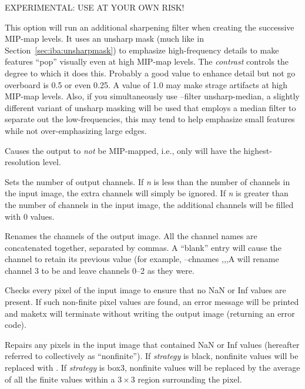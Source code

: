 EXPERIMENTAL: USE AT YOUR OWN RISK!

This option will run an additional sharpening filter
when creating the successive MIP-map levels. It uses an unsharp mask
(much like in Section~\ref{sec:iba:unsharpmask}) to emphasize high-frequency
details to make features ``pop'' visually even at high MIP-map levels.
The \emph{contrast} controls the degree to which it does this. Probably
a good value to enhance detail but not go overboard is 0.5 or even 0.25.
A value of 1.0 may make strage artifacts at high MIP-map levels. Also, if
you simultaneously use {\cf --filter unsharp-median}, a slightly different
variant of unsharp masking will be used that employs a median filter to
separate out the low-frequencies, this may tend to help emphasize small
features while not over-emphasizing large edges. 
\apiend

Causes the output to \emph{not} be MIP-mapped, i.e., only will have
the highest-resolution level.
\apiend

Sets the number of output channels.  If \emph{n} is less than the 
number of channels in the input image, the extra channels will simply
be ignored.  If \emph{n} is greater than the number of channels in the
input image, the additional channels will be filled with 0 values.
\apiend

Renames the channels of the output image.  All the channel names are
concatenated together, separated by commas.  A ``blank'' entry will cause
the channel to retain its previous value (for example, {\cf --chnames ,,,A}
will rename channel 3 to be  and leave channels 0--2 as they were.
\apiend

Checks every pixel of the input image to ensure that no NaN or Inf
values are present.  If such non-finite pixel values are found, 
an error message will be printed and {\cf maketx} will terminate without
writing the output image (returning an error code).
\apiend

Repairs any pixels in the input image that contained {\cf NaN} or 
{\cf Inf} values (hereafter referred to collectively as ``nonfinite'').
If \emph{strategy} is {\cf black}, nonfinite values will be replaced
with {}.  If \emph{strategy} is {\cf box3}, nonfinite values will
be replaced by the average of all the finite values within a $3 \times 3$
region surrounding the pixel.
\apiend

